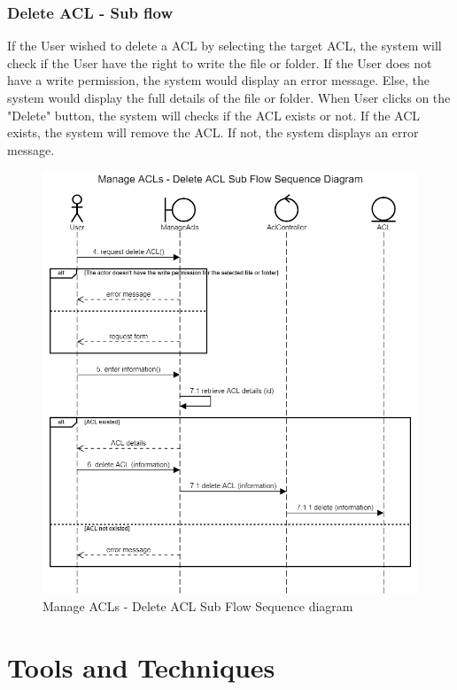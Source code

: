 \subsubsection{Delete ACL - Sub flow}
If the User wished to delete a ACL by selecting the target ACL, the system will check if the User have the right to write the file or folder. If the User does not have a write permission, the system would display an error message. Else, the system would display the full details of the file or folder. When User clicks on the "Delete" button, the system will checks if the ACL exists or not. If the ACL exists, the system will remove the ACL. If not, the system displays an error message.
\begin{figure}[H]
    \centering
    \includegraphics[width=1.0\textwidth]{images/Manage ACLs - Delete ACL Sub Flow Sequence Diagram.png}
    \caption{Manage ACLs - Delete ACL Sub Flow Sequence diagram}
    \label{fig:SeqACLsDelete}
\end{figure}

\section{Tools and Techniques}
